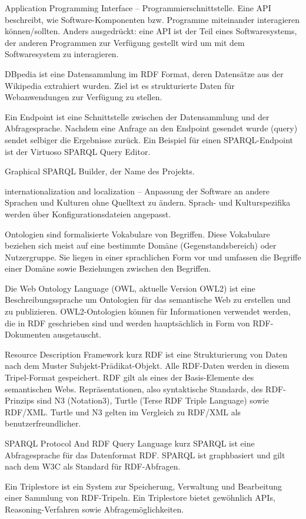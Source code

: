{Application Programming Interface -- Programmierschnittstelle.
Eine API be\hack{-\break}schreibt, wie Software-Komponenten
bzw. Programme miteinander interagieren können/sollten. Anders
ausgedrückt: eine API ist der Teil eines Softwaresystems, der anderen
Programmen zur Verfügung gestellt wird um mit dem Softwaresystem zu
interagieren.}

{DBpedia ist eine Datensammlung im RDF Format, deren Datensätze aus der Wikipedia extrahiert wurden. Ziel ist es strukturierte Daten für Webanwendungen zur Verfügung zu stellen.
\cite{dbpedia-wikipedia,dbpedia,dbpedia-datasets}}

{Ein Endpoint ist eine Schnittstelle zwischen der Datensammlung und der 
Abfragesprache. Nachdem eine Anfrage an den Endpoint gesendet wurde (query)  sendet selbiger die Ergebnisse zurück. Ein Beispiel für einen SPARQL-Endpoint ist der {\glqq}Virtuoso SPARQL Query Editor{\grqq}. \cite{dbpedia-sparql}}

{Graphical SPARQL Builder, der Name des Projekts. \cite{swp14-gsb}}

{internationalization and localization -- Anpassung der Software an andere Sprachen und Kulturen ohne Quelltext zu ändern. Sprach- und Kulturspezifika werden über Konfigurationsdateien angepasst.}

{Ontologien sind formalisierte Vokabulare von Begriffen. Diese Vokabulare beziehen sich meist auf eine bestimmte Domäne (Gegenstandsbereich) oder Nutzergruppe. Sie liegen in einer sprachlichen Form vor und umfassen die Begriffe einer Domäne sowie Beziehungen zwischen den Begriffen. \cite{owl,ontologie-wiki,fraunhofer}
}

{Die Web Ontology Language (OWL, aktuelle Version OWL2) ist eine Beschreibungssprache um Ontologien für das semantische Web zu erstellen und zu publizieren. OWL2-Ontologien können für Informationen verwendet werden, die in RDF geschrieben sind und werden hauptsächlich in Form von RDF-Dokumenten ausgetauscht.
\cite{owl}
}

{{\glqq}Resource Description Framework{\grqq} kurz RDF ist eine Strukturierung von Daten nach
dem Muster Subjekt-Prädikat-Objekt. Alle RDF-Daten werden in diesem Tripel-Format 
gespeichert. RDF gilt als eines der Basis-Elemente des semantischen Webs.
Repräsentationen, also syntaktische Standards, des RDF-Prinzips sind N3 (Notation3), 
Turtle (Terse RDF Triple Language) sowie RDF/XML. Turtle und N3 gelten im Vergleich zu RDF/XML als benutzerfreundlicher. \cite{rdf-primer,rdf-wiki,rdf-xml-wiki}}

{{\glqq}SPARQL Protocol And RDF Query Language{\grqq} kurz SPARQL ist eine Abfragesprache für das Datenformat RDF. SPARQL ist graphbasiert und gilt nach dem W3C als Standard für RDF-Abfragen. \cite{w3c-rdf-sparql-query,sparql-wiki}}

{Ein Triplestore ist ein System zur Speicherung, Verwaltung und Bearbeitung einer
 Sammlung von RDF-Tripeln. Ein Triplestore bietet gewöhnlich APIs,
 Rea\-so\-ning-Verfahren sowie Abfragemöglichkeiten. \cite{fraunhofer}}

